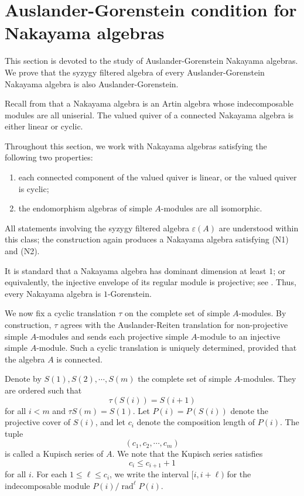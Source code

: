 \documentclass[a4paper,reqno]{amsart}
\numberwithin{equation}{section}
\theoremstyle{plain}
\theoremstyle{definition}
\theoremstyle{remark}
\DeclareMathOperator{\rad}{rad}
\renewcommand{\-}{\mbox{-}}
\begin{document}


\section{Auslander-Gorenstein condition for Nakayama algebras}


This section is devoted to the study of Auslander-Gorenstein  Nakayama algebras.
We prove that the syzygy filtered algebra of every Auslander-Gorenstein Nakayama algebra 
is also Auslander-Gorenstein. 

Recall from \cite{ARS95} that a Nakayama algebra is an Artin algebra 
whose indecomposable modules are all uniserial.
The valued quiver of a connected Nakayama algebra is either linear or cyclic.


Throughout this section, 
we work with Nakayama algebras satisfying the following two properties:
\begin{enumerate}
  \item[(N1)] each connected component of the valued quiver is linear, 
  or the valued quiver is cyclic;
  \item[(N2)] the endomorphism algebras of simple \(A\)-modules are all isomorphic.
\end{enumerate}
All statements involving the syzygy filtered algebra $\varepsilon(A)$ are understood within this class; the construction
again produces a Nakayama algebra satisfying (N1) and (N2).


It is standard that a Nakayama algebra has dominant dimension at least \(1\);
or equivalently, 
the injective envelope of its regular module is projective; see \cite{ARS95}. 
Thus, every Nakayama algebra is \(1\)-Gorenstein. 


We now fix a cyclic translation \(\tau\) on the complete set  of simple \(A\)-modules. 
By construction,   \(\tau\) agrees with the Auslander-Reiten translation 
for non-projective simple \(A\)-modules and 
sends  each projective simple \(A\)-module to an injective simple \(A\)-module. 
Such a cyclic translation is uniquely determined, 
provided that the algebra \(A\) is connected.



Denote by \(S(1),S(2),\cdots,S(m)\) the complete set of simple \(A\)-modules.
They are ordered such that
\[\tau(S(i))=S(i+1)\] for all \(i<m\) and \(\tau S(m)=S(1)\). 
Let \(P(i) = P(S(i))\) denote the projective cover of \(S(i)\), 
and let \(c_i\) denote the composition length of \(P(i)\).
The tuple 
\[(c_1,c_2,\cdots,c_m)\]
is called a Kupisch series of \(A\).
We note that the Kupisch series satisfies  
\[c_i\leq c_{i+1}+1\]
for all \(i\).
For each \(1\leq \ell\leq c_i\), 
we write the interval $[i,i+\ell)$ 
for the indecomposable module \(P(i)/\rad^{\ell}P(i)\).
\end{document}
